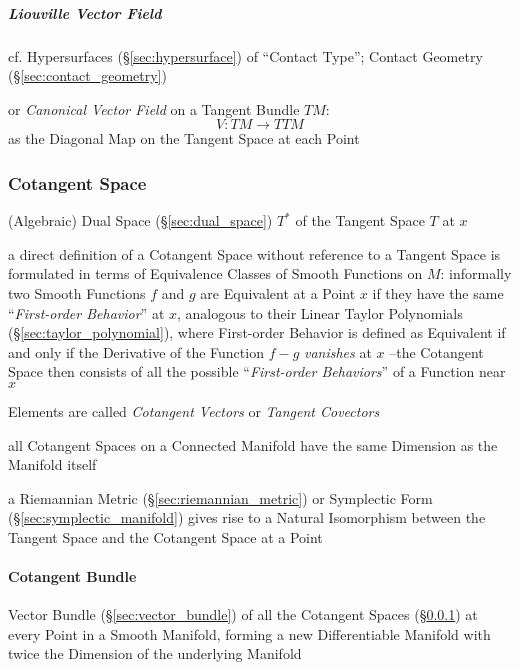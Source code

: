 \subparagraph{Liouville Vector Field}\label{sec:liouville_vector_field}\hfill

cf. Hypersurfaces (\S\ref{sec:hypersurface}) of ``Contact Type''; \fist Contact
Geometry (\S\ref{sec:contact_geometry})

or \emph{Canonical Vector Field} on a Tangent Bundle $TM$:
\[
  V : TM \rightarrow TTM
\]
as the Diagonal Map on the Tangent Space at each Point



\subsubsection{Cotangent Space}\label{sec:cotangent_space}

(Algebraic) Dual Space (\S\ref{sec:dual_space}) $T^*$ of the Tangent Space $T$
at $x$

a direct definition of a Cotangent Space without reference to a Tangent Space
is formulated in terms of Equivalence Classes of Smooth Functions on $M$:
informally two Smooth Functions $f$ and $g$ are Equivalent at a Point $x$ if
they have the same ``\emph{First-order Behavior}'' at $x$, analogous to their
Linear Taylor Polynomials (\S\ref{sec:taylor_polynomial}), where First-order
Behavior is defined as Equivalent if and only if the Derivative of the Function
$f-g$ \emph{vanishes} at $x$ --the Cotangent Space then consists of all the
possible ``\emph{First-order Behaviors}'' of a Function near $x$

Elements are called \emph{Cotangent Vectors} or \emph{Tangent Covectors}

all Cotangent Spaces on a Connected Manifold have the same Dimension as the
Manifold itself

a Riemannian Metric (\S\ref{sec:riemannian_metric}) or Symplectic Form
(\S\ref{sec:symplectic_manifold}) gives rise to a Natural Isomorphism between
the Tangent Space and the Cotangent Space at a Point



\paragraph{Cotangent Bundle}\label{sec:cotangent_bundle}\hfill

Vector Bundle (\S\ref{sec:vector_bundle}) of all the Cotangent Spaces
(\S\ref{sec:cotangent_space}) at every Point in a Smooth Manifold, forming a
new Differentiable Manifold with twice the Dimension of the underlying Manifold

